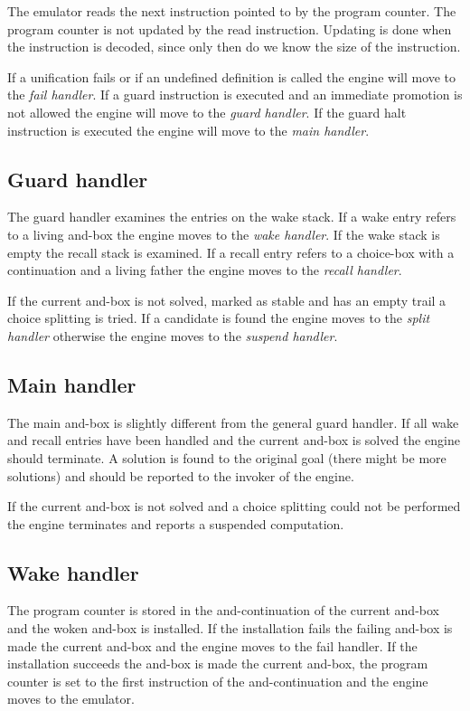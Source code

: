 The emulator reads the next instruction pointed to by the program
counter. The program counter is not updated by the read instruction.
Updating is done when the instruction is decoded, since only then do
we know the size of the instruction.

If a unification fails or if an undefined definition is called the
engine will move to the {\em fail handler}. If a guard instruction is
executed and an immediate promotion is not allowed the engine will move
to the {\em guard handler}. If the guard halt instruction is executed
the engine will move to the {\em main handler}.

\subsection*{Guard handler}

The guard handler examines the entries on the wake stack.  If a wake
entry refers to a living and-box the engine moves to the {\em wake
handler}. If the wake stack is empty  the recall stack is
examined. If a recall entry refers to a choice-box with a
continuation and a living father the engine moves to the {\em recall
handler}.

If the current and-box is not solved, marked as stable and has an
empty trail a choice splitting is tried. If a candidate is found the
engine moves to the {\em split handler} otherwise the engine moves to the
{\em suspend handler}.

\subsection*{Main handler}

The main and-box is slightly different from the general guard handler.
If all wake and recall entries have been handled and the current
and-box is solved the engine should terminate. A solution is found to
the original goal (there might be more solutions) and should be reported to 
the invoker of the engine.

If the current and-box is not solved and a choice splitting could not
be performed  the engine terminates and reports a suspended computation.

\subsection*{Wake handler}

The program counter is stored in the and-continuation of the current
and-box and the woken and-box is installed. If the installation fails
the failing and-box is made the current and-box and the engine moves to 
the fail handler.  If the installation succeeds the and-box
is made the current and-box, the program counter is set to the first 
instruction of the and-continuation and the engine moves to the emulator.


